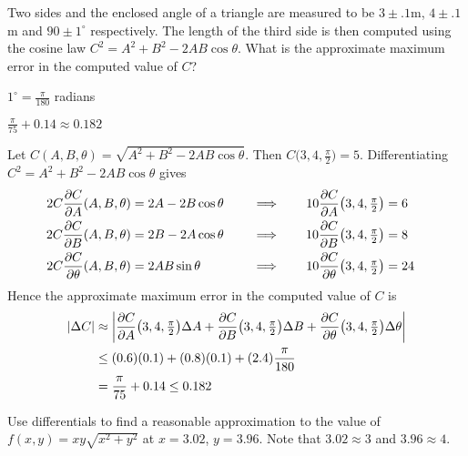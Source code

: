 \begin{question}[M200 2004A] %
Two sides and the enclosed angle of a triangle are measured to be
$3\pm.1$m, $4\pm.1$m and $90\pm 1^\circ$ respectively. The length of the
third side is then computed using the cosine law $C^2=A^2+B^2-2AB\cos\theta$.
What is the approximate maximum error in the computed value of $C$?
\end{question}

\begin{hint}
$1^\circ = \frac{\pi}{180}$ radians
\end{hint}

\begin{answer}
$\frac{\pi}{75}+0.14\approx 0.182$
\end{answer}

\begin{solution}
Let $C(A,B,\theta)=\sqrt{A^2+B^2-2AB\cos\theta}$. Then 
$C\big(3,4,\frac{\pi}{2}\big)=5$. Differentiating 
$C^2=A^2+B^2-2AB\cos\theta$ gives
\begin{alignat*}{5}
2C\frac{\partial C}{\partial A}(A,B,\theta)&=2A-2B\cos\theta &\quad&\implies\quad &
10\frac{\partial C}{\partial A}\big(3,4,\tfrac{\pi}{2}\big)&=6\cr
2C\frac{\partial C}{\partial B}(A,B,\theta)&=2B-2A\cos\theta &  &\implies &
10\frac{\partial C}{\partial B}\big(3,4,\tfrac{\pi}{2}\big)&=8\cr
2C\frac{\partial C}{\partial \theta}(A,B,\theta)&=2AB\sin\theta &  &\implies &
10\frac{\partial C}{\partial \theta}\big(3,4,\tfrac{\pi}{2}\big)&=24\cr
\end{alignat*}
Hence the approximate maximum error in the computed value of $C$ is
\begin{align*}
|\Delta C|&\approx \left|
\frac{\partial C}{\partial A}\big(3,4,\tfrac{\pi}{2}\big)\Delta A
+\frac{\partial C}{\partial B}\big(3,4,\tfrac{\pi}{2}\big)\Delta B
+\frac{\partial C}{\partial \theta}\big(3,4,\tfrac{\pi}{2}\big)\Delta\theta\right|
\\
&\le(0.6)(0.1)+(0.8)(0.1)+(2.4)\frac{\pi}{180}\cr
&=\frac{\pi}{75}+0.14\le 0.182
\end{align*}
\end{solution}

\begin{question} [M200 2003D] %
Use differentials to find a reasonable approximation to the
value of $f(x,y)=xy\sqrt{x^2+y^2}$ at $x=3.02$, $y=3.96$. Note that
$3.02\approx 3$ and $3.96\approx 4$.
\end{question}

